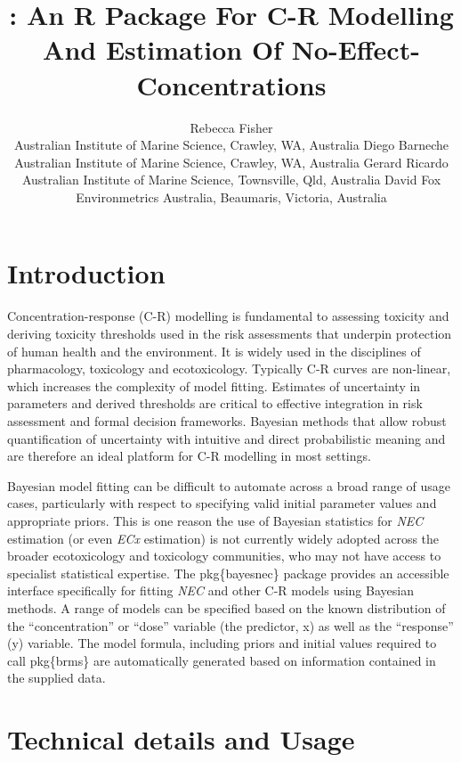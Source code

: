 \documentclass[
]{jss}
\author{
Rebecca Fisher\\Australian Institute of Marine Science, Crawley, WA,
Australia \And Diego Barneche\\Australian Institute of Marine Science,
Crawley, WA, Australia \And Gerard Ricardo\\Australian Institute of
Marine Science, Townsville, Qld, Australia \And David
Fox\\Environmetrics Australia, Beaumaris, Victoria, Australia
}
\title{\pkg{bayesnec}: An R Package For C-R Modelling And Estimation Of
No-Effect-Concentrations}
\begin{document}
\hypertarget{introduction}{%
\section{Introduction}\label{introduction}}

Concentration-response (C-R) modelling is fundamental to assessing
toxicity and deriving toxicity thresholds used in the risk assessments
that underpin protection of human health and the environment. It is
widely used in the disciplines of pharmacology, toxicology and
ecotoxicology. Typically C-R curves are non-linear, which increases the
complexity of model fitting. Estimates of uncertainty in parameters and
derived thresholds are critical to effective integration in risk
assessment and formal decision frameworks. Bayesian methods that allow
robust quantification of uncertainty with intuitive and direct
probabilistic meaning \citep{Ellison1996} and are therefore an ideal
platform for C-R modelling in most settings.

Bayesian model fitting can be difficult to automate across a broad range
of usage cases, particularly with respect to specifying valid initial
parameter values and appropriate priors. This is one reason the use of
Bayesian statistics for \emph{NEC} estimation (or even \emph{ECx}
estimation) is not currently widely adopted across the broader
ecotoxicology and toxicology communities, who may not have access to
specialist statistical expertise. The pkg\{bayesnec\} package provides
an accessible interface specifically for fitting \emph{NEC} and other
C-R models using Bayesian methods. A range of models can be specified
based on the known distribution of the ``concentration'' or ``dose''
variable (the predictor, x) as well as the ``response'' (y) variable.
The model formula, including priors and initial values required to call
pkg\{brms\} are automatically generated based on information contained
in the supplied data.

\hypertarget{technical-details-and-usage}{%
\section{Technical details and
Usage}\label{technical-details-and-usage}}
\end{document}
